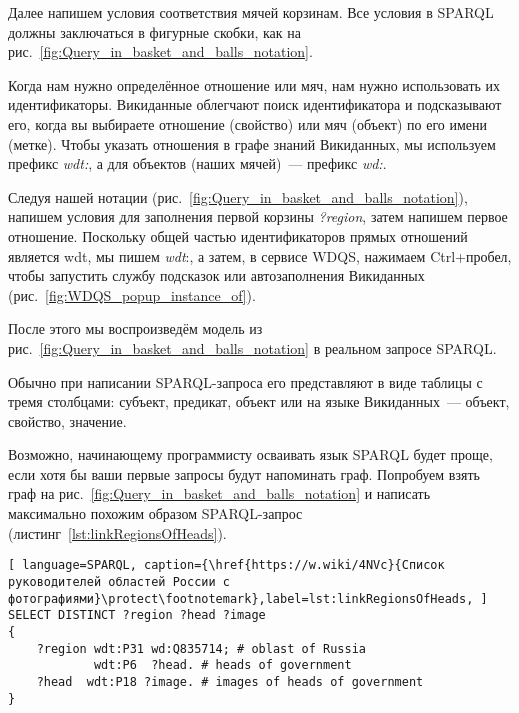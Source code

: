 Далее напишем условия соответствия мячей корзинам. Все условия в SPARQL должны заключаться в фигурные скобки, как на рис.~\ref{fig:Query_in_basket_and_balls_notation}.

Когда нам нужно определённое отношение или мяч, нам нужно использовать их идентификаторы. Викиданные облегчают поиск идентификатора и подсказывают его, когда вы выбираете отношение (свойство) или мяч (объект) по его имени (метке). Чтобы указать отношения в графе знаний Викиданных, мы используем префикс \textit{wdt:}, а для объектов (наших мячей)~--- префикс \textit{wd:}.

Следуя нашей нотации (рис.~\ref{fig:Query_in_basket_and_balls_notation}), напишем условия для заполнения первой корзины \textit{?region}, затем напишем первое отношение. Поскольку общей частью идентификаторов прямых отношений является wdt, мы пишем \textit{wdt}:, а затем, в сервисе WDQS, нажимаем Ctrl+пробел, чтобы запустить службу подсказок или  автозаполнения Викиданных (рис.~\ref{fig:WDQS_popup_instance_of}).

\begin{marginfigure}[-2.5cm]
	{
		\setlength{\fboxsep}{0pt}%
		\setlength{\fboxrule}{1pt}%
	}
    \caption{С помощью команды Ctrl+пробел открылось выпадающее контекстное меню автозаполнения свойства Викиданых.}
	\label{fig:WDQS_popup_instance_of}
\end{marginfigure}

После этого мы воспроизведём модель из рис.~\ref{fig:Query_in_basket_and_balls_notation} в реальном запросе SPARQL.

Обычно при написании SPARQL-запроса его представляют в виде таблицы с тремя столбцами: субъект, предикат, объект или на языке Викиданных~--- объект, свойство, значение.

Возможно, начинающему программисту осваивать язык SPARQL будет проще, если хотя бы ваши первые запросы будут напоминать граф. Попробуем взять граф на рис.~\ref{fig:Query_in_basket_and_balls_notation} и написать максимально похожим образом SPARQL-запрос (листинг~\ref{lst:linkRegionsOfHeads}).

\begin{lstlisting}[ language=SPARQL, caption={\href{https://w.wiki/4NVc}{Список руководителей областей России с фотографиями}\protect\footnotemark},label=lst:linkRegionsOfHeads, ]
SELECT DISTINCT ?region ?head ?image
{
    ?region wdt:P31 wd:Q835714; # oblast of Russia
            wdt:P6  ?head. # heads of government
    ?head  wdt:P18 ?image. # images of heads of government
}
\end{lstlisting}


